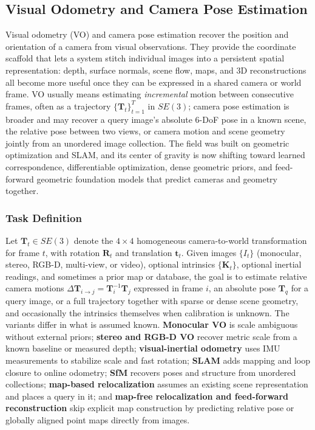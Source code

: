 \subsection{Visual Odometry and Camera Pose Estimation}
\label{sec:visual_odometry}

Visual odometry (VO) and camera pose estimation recover the position and orientation of a camera from visual observations.
They provide the coordinate scaffold that lets a system stitch individual images into a persistent spatial representation: depth, surface normals, scene flow, maps, and 3D reconstructions all become more useful once they can be expressed in a shared camera or world frame.
VO usually means estimating \emph{incremental} motion between consecutive frames, often as a trajectory $\{\mathbf{T}_t\}_{t=1}^{T}$ in $SE(3)$; camera pose estimation is broader and may recover a query image's absolute 6-DoF pose in a known scene, the relative pose between two views, or camera motion and scene geometry jointly from an unordered image collection.
The field was built on geometric optimization and SLAM, and its center of gravity is now shifting toward learned correspondence, differentiable optimization, dense geometric priors, and feed-forward geometric foundation models that predict cameras and geometry together.

\subsubsection{Task Definition}

Let $\mathbf{T}_t\in SE(3)$ denote the $4\times4$ homogeneous camera-to-world transformation for frame $t$, with rotation $\mathbf{R}_t$ and translation $\mathbf{t}_t$.
Given images $\{I_t\}$ (monocular, stereo, RGB-D, multi-view, or video), optional intrinsics $\{\mathbf{K}_t\}$, optional inertial readings, and sometimes a prior map or database, the goal is to estimate relative camera motions $\Delta\mathbf{T}_{i\rightarrow j}=\mathbf{T}_i^{-1}\mathbf{T}_j$ expressed in frame $i$, an absolute pose $\mathbf{T}_q$ for a query image, or a full trajectory together with sparse or dense scene geometry, and occasionally the intrinsics themselves when calibration is unknown.
The variants differ in what is assumed known.
\textbf{Monocular VO} is scale ambiguous without external priors; \textbf{stereo and RGB-D VO} recover metric scale from a known baseline or measured depth; \textbf{visual-inertial odometry} uses IMU measurements to stabilize scale and fast rotation; \textbf{SLAM} adds mapping and loop closure to online odometry; \textbf{SfM} recovers poses and structure from unordered collections; \textbf{map-based relocalization} assumes an existing scene representation and places a query in it; and \textbf{map-free relocalization and feed-forward reconstruction} skip explicit map construction by predicting relative pose or globally aligned point maps directly from images.

